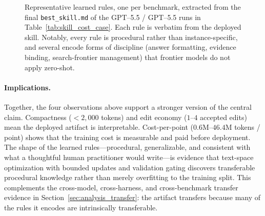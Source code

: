\begin{figure}[t]
\centering
{}
\caption{Representative learned rules, one per benchmark, extracted from the final \texttt{best\_skill.md} of the GPT--5.5 / GPT--5.5 runs in Table~\ref{tab:skill_cost_case}. Each rule is verbatim from the deployed skill. Notably, every rule is procedural rather than instance-specific, and several encode forms of discipline (answer formatting, evidence binding, search-frontier management) that frontier models do not apply zero-shot.}
\label{fig:skill_excerpts}
\end{figure}

\paragraph{Implications.}
Together, the four observations above support a stronger version of the central claim. Compactness ($<2{,}000$ tokens) and edit economy ($1$--$4$ accepted edits) mean the deployed artifact is interpretable. Cost-per-point ($0.6$M--$46.4$M tokens / point) shows that the training cost is measurable and paid before deployment. The shape of the learned rules---procedural, generalizable, and consistent with what a thoughtful human practitioner would write---is evidence that text-space optimization with bounded updates and validation gating discovers transferable procedural knowledge rather than merely overfitting to the training split. This complements the cross-model, cross-harness, and cross-benchmark transfer evidence in Section~\ref{sec:analysis_transfer}: the artifact transfers because many of the rules it encodes are intrinsically transferable.

